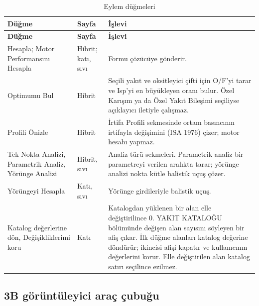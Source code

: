 \documentclass[11pt,a4paper]{article}
\newcommand{\ui}[1]{\textsf{#1}}
\begin{document}
\begin{longtable}{@{}>{\raggedright\arraybackslash}p{3.8cm}>{\raggedright\arraybackslash}p{2.0cm}>{\raggedright\arraybackslash}p{9.8cm}@{}}
\caption{Eylem düğmeleri}\label{tab:dugmeler}\\
\toprule
\textbf{Düğme} & \textbf{Sayfa} & \textbf{İşlevi} \\
\midrule\endfirsthead
\toprule
\textbf{Düğme} & \textbf{Sayfa} & \textbf{İşlevi} \\
\midrule\endhead
\bottomrule\endlastfoot
\ui{Hesapla}; \ui{Motor Performansını Hesapla} & Hibrit; katı, sıvı & Formu çözücüye gönderir. \\
\ui{Optimumu Bul} & Hibrit & Seçili yakıt ve oksitleyici çifti için O/F'yi tarar ve Isp'yi en büyükleyen oranı bulur. \ui{Özel Karışım} ya da \ui{Özel Yakıt Bileşimi} seçiliyse açıklayıcı iletiyle çalışmaz. \\
\ui{Profili Önizle} & Hibrit & \ui{İrtifa Profili} sekmesinde ortam basıncının irtifayla değişimini (ISA 1976) çizer; motor hesabı yapmaz. \\
\ui{Tek Nokta Analizi}, \ui{Parametrik Analiz}, \ui{Yörünge Analizi} & Hibrit, sıvı & Analiz türü sekmeleri. Parametrik analiz bir parametreyi verilen aralıkta tarar; yörünge analizi nokta kütle balistik uçuş çözer. \\
\ui{Yörüngeyi Hesapla} & Katı, sıvı & Yörünge girdileriyle balistik uçuş. \\
\ui{Katalog değerlerine dön}, \ui{Değişikliklerimi koru} & Katı & Katalogdan yüklenen bir alan elle değiştirilince \ui{0. YAKIT KATALOĞU} bölümünde değişen alan sayısını söyleyen bir afiş çıkar. İlk düğme alanları katalog değerine döndürür; ikincisi afişi kapatır ve kullanıcının değerlerini korur. Elle değiştirilen alan katalog satırı seçilince ezilmez. \\
\end{longtable}

\subsection{3B görüntüleyici araç çubuğu}
\end{document}
